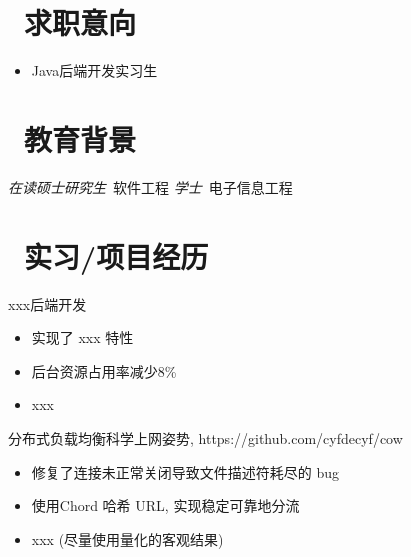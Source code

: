 \documentclass{resume}
\begin{document}


 
\section{\faHeartO\ 求职意向} 
\begin{itemize}[parsep=0.5ex]
  \item Java后端开发实习生
\end{itemize}

\section{\faGraduationCap\  教育背景}
\textit{在读硕士研究生}\   软件工程
\textit{学士}\    电子信息工程

\section{\faUsers\ 实习/项目经历}
xxx后端开发
\begin{itemize}
  \item 实现了 xxx 特性
  \item 后台资源占用率减少8\%
  \item xxx
\end{itemize}

\begin{onehalfspacing}
分布式负载均衡科学上网姿势, https://github.com/cyfdecyf/cow
\begin{itemize}
  \item 修复了连接未正常关闭导致文件描述符耗尽的 bug
  \item 使用Chord 哈希 URL, 实现稳定可靠地分流
  \item xxx (尽量使用量化的客观结果)
\end{itemize}
\end{onehalfspacing}

\end{document}
